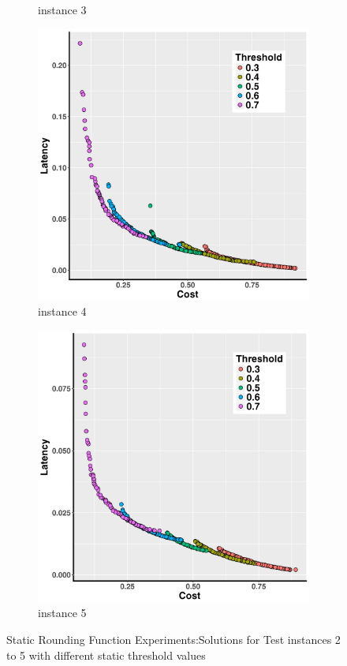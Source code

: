 \documentclass[10pt,journal,compsoc]{IEEEtran}
\begin{document}
\begin{figure}[h!]
\begin{subfigure}{0.49\linewidth}
    \caption{instance 3}
   \end{subfigure}
   \begin{subfigure}{0.49\linewidth}
       \includegraphics[width=\textwidth]{pics/static_threshold_problem_4.png}
    \caption{instance 4}
   \end{subfigure}
   \begin{subfigure}{0.49\linewidth}
       \includegraphics[width=\textwidth]{pics/static_threshold_problem_5.png}
    \caption{instance 5}
   \end{subfigure}
   \caption{Static Rounding Function Experiments:Solutions for Test instances 2 to 5 with different static threshold values}
   \label{fig:staticFunctions}
\end{figure}
\end{document}
